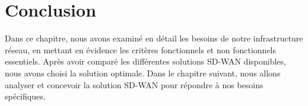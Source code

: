 \section*{Conclusion }

Dans ce chapitre, nous avons examiné en détail les besoins de notre infrastructure réseau, en mettant en évidence les critères fonctionnels et non fonctionnels essentiels. Après avoir comparé les différentes solutions SD-WAN disponibles, nous avons choisi la solution optimale. Dans le chapitre suivant, nous allons analyser et concevoir la solution SD-WAN pour répondre à nos besoins spécifiques.




